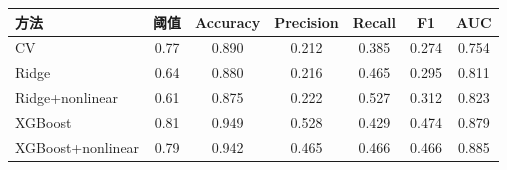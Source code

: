 \begin{tabular}{lcccccc}
\toprule
方法 & 阈值 & Accuracy & Precision & Recall & F1 & AUC \\ 
\midrule
CV & 0.77 & 0.890 & 0.212 & 0.385 & 0.274 & 0.754 \\ 
Ridge & 0.64 & 0.880 & 0.216 & 0.465 & 0.295 & 0.811 \\ 
Ridge+nonlinear & 0.61 & 0.875 & 0.222 & 0.527 & 0.312 & 0.823 \\ 
XGBoost & 0.81 & 0.949 & 0.528 & 0.429 & 0.474 & 0.879 \\ 
XGBoost+nonlinear & 0.79 & 0.942 & 0.465 & 0.466 & 0.466 & 0.885 \\ 
\bottomrule
\end{tabular}
